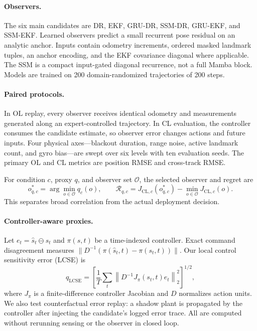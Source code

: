 \documentclass{article}
\newcommand{\CL}{\mathrm{CL}}
\newcommand{\obs}[1]{\textsc{#1}}
\begin{document}
\paragraph{Observers.}
The six main candidates are \obs{DR}, \obs{EKF}, \obs{GRU-DR}, \obs{SSM-DR}, \obs{GRU-EKF}, and \obs{SSM-EKF}. Learned observers predict a small recurrent pose residual on an analytic anchor. Inputs contain odometry increments, ordered masked landmark tuples, an anchor encoding, and the EKF covariance diagonal where applicable. The SSM is a compact input-gated diagonal recurrence, not a full Mamba block. Models are trained on 200 domain-randomized trajectories of 200 steps.

\paragraph{Paired protocols.}
In OL replay, every observer receives identical odometry and measurements generated along an expert-controlled trajectory. In CL evaluation, the controller consumes the candidate estimate, so observer error changes actions and future inputs. Four physical axes---blackout duration, range noise, active landmark count, and gyro bias---are swept over six levels with ten evaluation seeds. The primary OL and CL metrics are position RMSE and cross-track RMSE.

For condition $c$, proxy $q$, and observer set $\mathcal O$, the selected observer and regret are
\begin{equation}
 o^*_{q,c}=\arg\min_{o\in\mathcal O}q_c(o),\qquad
 \mathcal R_{q,c}=J_{\CL,c}(o^*_{q,c})-\min_{o\in\mathcal O}J_{\CL,c}(o).
\end{equation}
This separates broad correlation from the actual deployment decision.

\paragraph{Controller-aware proxies.}
Let $e_t=\hat s_t\ominus s_t$ and $\pi(s,t)$ be a time-indexed controller. Exact command disagreement measures $\|D^{-1}(\pi(\hat s_t,t)-\pi(s_t,t))\|$. Our local control sensitivity error (LCSE) is
\begin{equation}
 q_{\mathrm{LCSE}}=\left[\frac{1}{T}\sum_t\left\|D^{-1}J_{\pi}(s_t,t)e_t\right\|_2^2\right]^{1/2},
\end{equation}
where $J_{\pi}$ is a finite-difference controller Jacobian and $D$ normalizes action units. We also test counterfactual error replay: a shadow plant is propagated by the controller after injecting the candidate's logged error trace. All are computed without rerunning sensing or the observer in closed loop.
\end{document}
